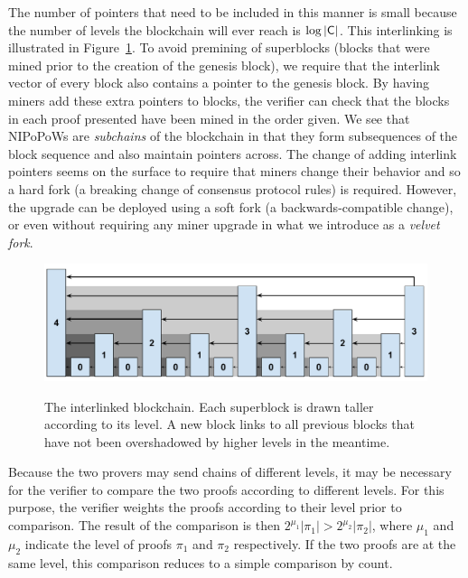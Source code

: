The number of pointers that need to be included in this manner is small because
the number of levels the blockchain will ever reach is $\log|\mathsf{C}|$. This
interlinking is illustrated in Figure~\ref{fig.hierarchy}. To avoid premining of
superblocks (blocks that were mined prior to the creation of the genesis block),
we require that the interlink vector of every block also contains a pointer to
the genesis block. By having miners add these extra pointers to blocks, the
verifier can check that the blocks in each proof presented have been mined in
the order given. We see that NIPoPoWs are \emph{subchains} of the blockchain in
that they form subsequences of the block sequence and also maintain pointers
across. The change of adding interlink pointers seems on the surface to require
that miners change their behavior and so a hard fork (a breaking change of
consensus protocol rules) is required. However, the upgrade can be deployed
using a soft fork (a backwards-compatible change), or even without requiring any
miner upgrade in what we introduce as a \emph{velvet fork}.

\begin{figure}[ht]
    \caption{The interlinked blockchain. Each superblock is drawn taller
    according to its level. A new block links to all previous blocks that
    have not been overshadowed by higher levels in the meantime.}
    \centering
    \includegraphics[width=0.9\columnwidth,keepaspectratio]{../chapters/introduction/figures/level-shadows.pdf}
    \label{fig.hierarchy}
\end{figure}

Because the two provers may send chains of different levels, it may be necessary
for the verifier to compare the two proofs according to different levels. For
this purpose, the verifier weights the proofs according to their level prior to
comparison. The result of the comparison is then
$2^{\mu_1}|\pi_1| > 2^{\mu_2}|\pi_2|$, where $\mu_1$ and $\mu_2$ indicate the
level of proofs $\pi_1$ and $\pi_2$ respectively. If the two proofs are at the
same level, this comparison reduces to a simple comparison by count.

